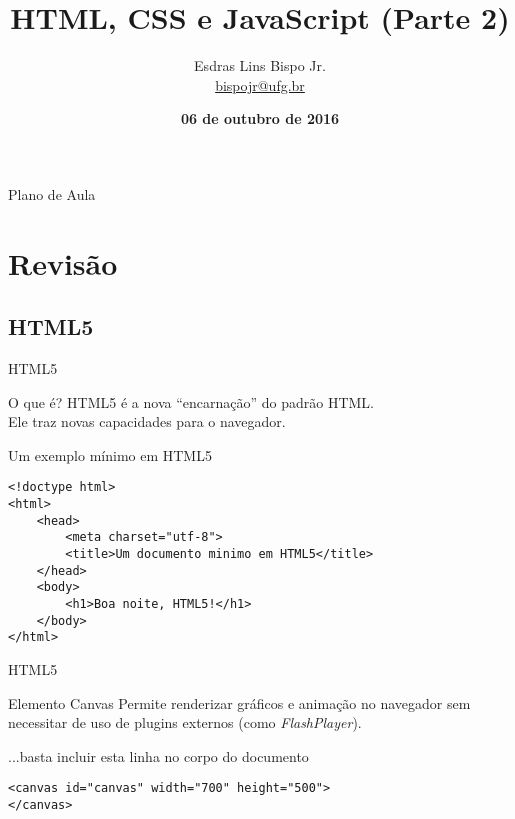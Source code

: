 \documentclass[xcolor=dvipsnames,table]{beamer}
\title{HTML, CSS e JavaScript (Parte 2)}
\author{
  Esdras Lins Bispo Jr. \\ \url{bispojr@ufg.br}
  }
\institute{
  Física para Ciência da Computação \\Bacharelado em Ciência da Computação}
\date{\textbf{06 de outubro de 2016} }
\begin{document}
	\begin{frame}
		\titlepage
	\end{frame}

	\AtBeginSection{
		\begin{frame}{Sumário}%
    		\tableofcontents[currentsection]
		\end{frame}
	}

	\begin{frame}{Plano de Aula}
		\tableofcontents
	\end{frame}

	\section{Revisão}
		
\subsection{HTML5}
\begin{frame}[fragile]{HTML5}
	\begin{block}{O que é?}
			HTML5 é a nova ``encarnação'' do padrão HTML. \\Ele traz novas capacidades para o navegador.
		\end{block} 
		\begin{block}{Um exemplo mínimo em HTML5}
			\begin{lstlisting}
<!doctype html>
<html>
	<head>
		<meta charset="utf-8">
		<title>Um documento minimo em HTML5</title>
	</head>
	<body>
		<h1>Boa noite, HTML5!</h1>
	</body>
</html>
\end{lstlisting}
		\end{block}
\end{frame}

\begin{frame}[fragile]{HTML5}
	\begin{block}{Elemento Canvas}
		Permite renderizar gráficos e animação no navegador sem necessitar de uso de plugins externos (como {\it FlashPlayer}).
	\end{block} 
		\begin{block}{...basta incluir esta linha no corpo do documento}
			\begin{lstlisting}
<canvas id="canvas" width="700" height="500">
</canvas>
\end{lstlisting}
		\end{block}
\end{frame}
\end{document}
